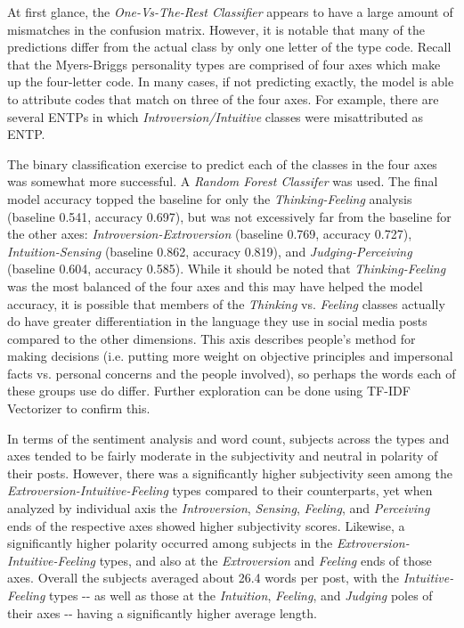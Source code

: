 \documentclass[11pt]{article}
\begin{document}
At first glance, the \emph{One-Vs-The-Rest Classifier} appears to have a
large amount of mismatches in the confusion matrix. However, it is
notable that many of the predictions differ from the actual class by
only one letter of the type code. Recall that the Myers-Briggs
personality types are comprised of four axes which make up the
four-letter code. In many cases, if not predicting exactly, the model is
able to attribute codes that match on three of the four axes. For
example, there are several ENTPs in which \emph{Introversion/Intuitive}
classes were misattributed as ENTP.

The binary classification exercise to predict each of the classes in the
four axes was somewhat more successful. A \emph{Random Forest Classifer}
was used. The final model accuracy topped the baseline for only the
\emph{Thinking-Feeling} analysis (baseline 0.541, accuracy 0.697), but
was not excessively far from the baseline for the other axes:
\emph{Introversion-Extroversion} (baseline 0.769, accuracy 0.727),
\emph{Intuition-Sensing} (baseline 0.862, accuracy 0.819), and
\emph{Judging-Perceiving} (baseline 0.604, accuracy 0.585). While it
should be noted that \emph{Thinking-Feeling} was the most balanced of
the four axes and this may have helped the model accuracy, it is
possible that members of the \emph{Thinking} vs. \emph{Feeling} classes
actually do have greater differentiation in the language they use in
social media posts compared to the other dimensions. This axis describes
people's method for making decisions (i.e. putting more weight on
objective principles and impersonal facts vs. personal concerns and the
people involved), so perhaps the words each of these groups use do
differ. Further exploration can be done using TF-IDF Vectorizer to
confirm this.

In terms of the sentiment analysis and word count, subjects across the
types and axes tended to be fairly moderate in the subjectivity and
neutral in polarity of their posts. However, there was a significantly
higher subjectivity seen among the \emph{Extroversion-Intuitive-Feeling}
types compared to their counterparts, yet when analyzed by individual
axis the \emph{Introversion}, \emph{Sensing}, \emph{Feeling}, and
\emph{Perceiving} ends of the respective axes showed higher subjectivity
scores. Likewise, a significantly higher polarity occurred among
subjects in the \emph{Extroversion-Intuitive-Feeling} types, and also at
the \emph{Extroversion} and \emph{Feeling} ends of those axes. Overall
the subjects averaged about 26.4 words per post, with the
\emph{Intuitive-Feeling} types -\/- as well as those at the
\emph{Intuition}, \emph{Feeling}, and \emph{Judging} poles of their axes
-\/- having a significantly higher average length.
\end{document}
